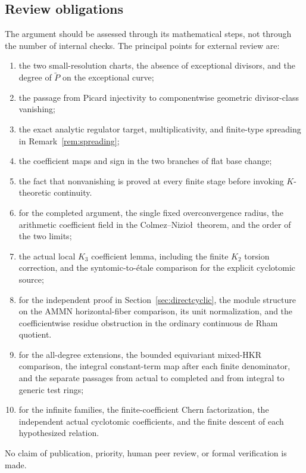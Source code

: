 \documentclass[11pt,a4paper]{article}
\theoremstyle{remark}
\begin{document}
\subsection{Review obligations}
The argument should be assessed through its mathematical steps, not through the number of internal checks. The principal points for external review are:
\begin{enumerate}
\item the two small-resolution charts, the absence of exceptional divisors, and the degree of $\widetilde P$ on the exceptional curve;
\item the passage from Picard injectivity to componentwise geometric divisor-class vanishing;
\item the exact analytic regulator target, multiplicativity, and finite-type spreading in Remark~\ref{rem:spreading};
\item the coefficient maps and sign in the two branches of flat base change;
\item the fact that nonvanishing is proved at every finite stage before invoking $K$-theoretic continuity.
\item for the completed argument, the single fixed overconvergence radius, the arithmetic coefficient field in the Colmez--Nizio\l\ theorem, and the order of the two limits;
\item the actual local $K_3$ coefficient lemma, including the finite $K_2$ torsion correction, and the syntomic-to-\'etale comparison for the explicit cyclotomic source;
\item for the independent proof in Section~\ref{sec:directcyclic}, the module structure on the AMMN horizontal-fiber comparison, its unit normalization, and the coefficientwise residue obstruction in the ordinary continuous de Rham quotient.
\item for the all-degree extensions, the bounded equivariant mixed-HKR
comparison, the integral constant-term map after each finite denominator,
and the separate passages from actual to completed and from integral
to generic test rings;
\item for the infinite families, the finite-coefficient Chern
factorization, the independent actual cyclotomic coefficients, and the
finite descent of each hypothesized relation.

\end{enumerate}
No claim of publication, priority, human peer review, or formal verification is made.
\end{document}

